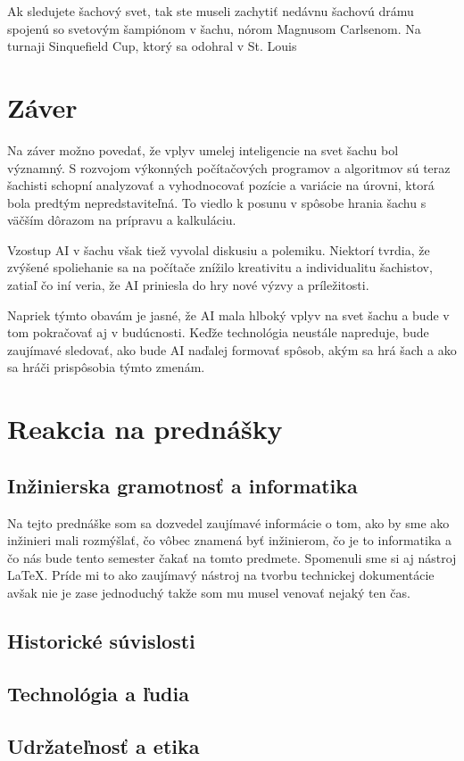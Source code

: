\documentclass[10pt,oneside,slovak,a4paper]{article}
\begin{document}
Ak sledujete šachový svet, tak ste museli zachytiť nedávnu šachovú drámu spojenú so svetovým šampiónom v šachu, nórom Magnusom Carlsenom. Na turnaji Sinquefield Cup, ktorý sa odohral v St. Louis


\section{Záver}

Na záver možno povedať, že vplyv umelej inteligencie na svet šachu bol významný. S rozvojom výkonných počítačových programov a algoritmov sú teraz šachisti schopní analyzovať a vyhodnocovať pozície a variácie na úrovni, ktorá bola predtým nepredstaviteľná. To viedlo k posunu v spôsobe hrania šachu s väčším dôrazom na prípravu a kalkuláciu.

Vzostup AI v šachu však tiež vyvolal diskusiu a polemiku. Niektorí tvrdia, že zvýšené spoliehanie sa na počítače znížilo kreativitu a individualitu šachistov, zatiaľ čo iní veria, že AI priniesla do hry nové výzvy a príležitosti.

Napriek týmto obavám je jasné, že AI mala hlboký vplyv na svet šachu a bude v tom pokračovať aj v budúcnosti. Keďže technológia neustále napreduje, bude zaujímavé sledovať, ako bude AI naďalej formovať spôsob, akým sa hrá šach a ako sa hráči prispôsobia týmto zmenám.

\section{Reakcia na prednášky}
\subsection{Inžinierska gramotnosť a informatika}

Na tejto prednáške som sa dozvedel zaujímavé informácie o tom, ako by sme ako inžinieri mali rozmýšlať, čo vôbec znamená byť inžinierom, čo je to informatika a čo nás bude tento semester čakať na tomto predmete. Spomenuli sme si aj nástroj LaTeX. Príde mi to ako zaujímavý nástroj na tvorbu technickej dokumentácie avšak nie je zase jednoduchý takže som mu musel venovať nejaký ten čas.


\subsection{Historické súvislosti}

\subsection{Technológia a ľudia}

\subsection{Udržateľnosť a etika}




\end{document}
